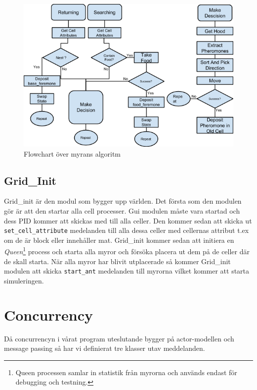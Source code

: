 \begin{figure}
\includegraphics[scale=0.6]{Figures/myralgo.png}
\caption{Flowchart över myrans algoritm}
\label{fig:myralgo}
\end{figure}

\subsection{Grid\_Init}

Grid\_init är den modul som bygger upp världen. Det första som den modulen gör är att den startar alla cell processer. Gui modulen måste vara startad och dess PID kommer att skickas med till alla celler. Den kommer sedan att skicka ut \verb+set_cell_attribute+ medelanden till alla dessa celler med cellernas attribut t.ex om de är block eller innehåller mat. Grid\_init kommer sedan att initiera en \emph{Queen}\footnote{Queen processen samlar in statistik från myrorna och används endast för debugging och testning.} process och starta alla myror och försöka placera ut dem på de celler där de skall starta. När alla myror har blivit utplacerade så kommer Grid\_init modulen att skicka \verb+start_ant+ medelanden till myrorna vilket kommer att starta simuleringen.

\section{Concurrency}

Då concurrencyn i vårat program uteslutande bygger på actor-modellen och message passing så har vi definierat tre klasser utav meddelanden.

